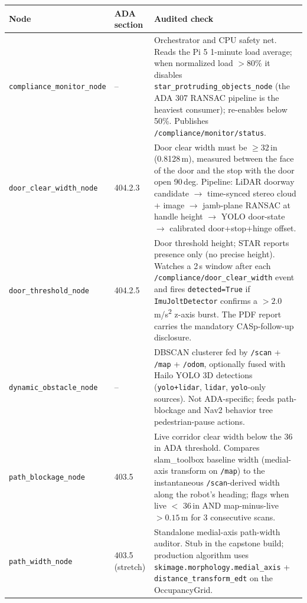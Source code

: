\begin{center}
\begin{tabular}{|p{4.2cm}|p{2.0cm}|p{8.2cm}|}
\hline
\textbf{Node} & \textbf{ADA section} & \textbf{Audited check} \\
\hline
\texttt{compliance\_\allowbreak monitor\_node}      & --                 & Orchestrator and CPU safety net. Reads the Pi 5 1-minute load average; when normalized load $> 80\%$ it disables \texttt{star\_protruding\_objects\_node} (the ADA 307 RANSAC pipeline is the heaviest consumer); re-enables below 50\%. Publishes \texttt{/compliance/monitor/status}. \\
\hline
\texttt{door\_clear\_\allowbreak width\_node}        & 404.2.3            & Door clear width must be $\geq 32$\,in (0.8128\,m), measured between the face of the door and the stop with the door open 90\,deg. Pipeline: LiDAR doorway candidate $\rightarrow$ time-synced stereo cloud + image $\rightarrow$ jamb-plane RANSAC at handle height $\rightarrow$ YOLO door-state $\rightarrow$ calibrated door+stop+hinge offset. \\
\hline
\texttt{door\_\allowbreak threshold\_node}           & 404.2.5            & Door threshold height; STAR reports presence only (no precise height). Watches a 2\,s window after each \texttt{/compliance/door\_clear\_width} event and fires \texttt{detected=True} if \texttt{ImuJoltDetector} confirms a $> 2.0$\,m/s\textsuperscript{2} z-axis burst. The PDF report carries the mandatory CASp-follow-up disclosure. \\
\hline
\texttt{dynamic\_\allowbreak obstacle\_node}         & --                 & DBSCAN clusterer fed by \texttt{/scan} + \texttt{/map} + \texttt{/odom}, optionally fused with Hailo YOLO 3D detections (\texttt{yolo+lidar}, \texttt{lidar}, \texttt{yolo}-only sources). Not ADA-specific; feeds path-blockage and Nav2 behavior tree pedestrian-pause actions. \\
\hline
\texttt{path\_blockage\_node}                         & 403.5              & Live corridor clear width below the 36\,in ADA threshold. Compares slam\_toolbox baseline width (medial-axis transform on \texttt{/map}) to the instantaneous \texttt{/scan}-derived width along the robot's heading; flags when live $<$ 36\,in AND map-minus-live $> 0.15$\,m for 3 consecutive scans. \\
\hline
\texttt{path\_width\_node}                            & 403.5 (stretch)    & Standalone medial-axis path-width auditor. Stub in the capstone build; production algorithm uses \texttt{skimage.morphology.medial\_axis} + \texttt{distance\_transform\_edt} on the OccupancyGrid. \\

\end{tabular}
\end{center}

